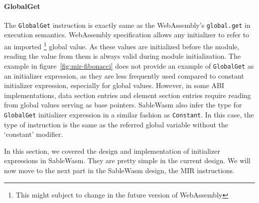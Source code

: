 \paragraph{GlobalGet}
The \texttt{GlobalGet} instruction is exactly same as the WebAssembly's
\texttt{global.get} in execution semantics. WebAssembly specification allows any
initializer to refer to an imported \footnote{This might subject to change in
  the future version of WebAssembly} global value. As these values are
initialized before the module, reading the value from them is always valid
during module initialization. The example in figure~\ref{fig:mir-fibonacci} does
not provide an example of \texttt{GlobalGet} as an initializer expression, as
they are less frequently used compared to constant initializer expression,
especially for global values. However, in some ABI implementations, data section
entries and element section entries require reading from global values serving
as base pointers. SableWasm also infer the type for \texttt{GlobalGet}
initializer expression in a similar fashion as \texttt{Constant}. In this case,
the type of instruction is the same as the referred global variable without the
`constant' modifier.

In this section, we covered the design and implementation of initializer
expressions in SableWasm. They are pretty simple in the current design. We will
now move to the next part in the SableWasm design, the MIR instructions.